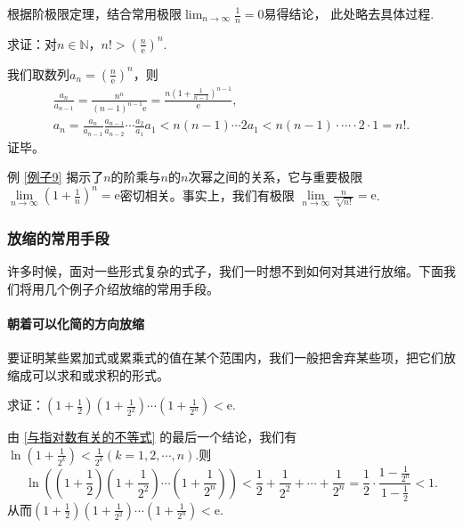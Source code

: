 \begin{itemize}
\begin{prove}
              根据阶极限定理，结合常用极限$\lim_{n\to \infty}\frac{1}{n} = 0$易得结论，
              此处略去具体过程.
          \end{prove}


          \begin{example}
              求证：对$n\in \mathbb{N}$，$n!>\left (\frac{n}{\mathrm e} \right )^n$.\label{例子9}
          \end{example}
          \begin{prove}
              我们取数列$a_n=\left (\frac{n}{\mathrm e} \right )^n$，则
              \begin{gather}
                  \frac{a_n}{a_{n-1}}=\frac{n^n}{(n-1)^{n-1}\mathrm e}=\frac{n\left (1+\frac{1}{n-1}\right )^{n-1}}{\mathrm e},\\
                  a_n=\frac{a_n}{a_{n-1}} \frac{a_{n-1}}{a_{n-2}}\cdots \frac{a_2}{a_1} a_1< n(n-1)\cdots 2a_1<n(n-1)\cdot \cdots \cdot 2\cdot 1=n!.
              \end{gather}
              证毕。
          \end{prove}

          例 \autoref{例子9} 揭示了$n$的阶乘与$n$的$n$次幂之间的关系，它与重要极限$\lim\limits_{n \to \infty}\left (1
              +\frac{1}{n}\right )^n=\mathrm e$密切相关。事实上，我们有极限
          $\lim\limits_{n \to \infty}\frac{n}{\sqrt[n]{n!}}=\mathrm e$.
\end{itemize}

\subsubsection{放缩的常用手段}
\label{sssec:A}
许多时候，面对一些形式复杂的式子，我们一时想不到如何对其进行放缩。下面我们将用几个例子介绍放缩的常用手段。

\paragraph{朝着可以化简的方向放缩}

要证明某些累加式或累乘式的值在某个范围内，我们一般把舍弃某些项，把它们放缩成可以求和或求积的形式。
\begin{example}
    求证：$\left ( 1+\frac{1}{2}\right )\left ( 1+\frac{1}{2^2}\right )
        \cdots \left ( 1+\frac{1}{2^n}\right )<\mathrm{e}$.
\end{example}
\begin{prove}
    由 \eqref{与指对数有关的不等式} 的最后一个结论，我们有$\ln \left ( 1+\frac{1}{2^k}\right )<\frac{1}{2^k}(k=1,2,\cdots,n)$.则
    \[
        \ln\left( \left ( 1+\frac{1}{2}\right )\left ( 1+\frac{1}{2^2}\right )
        \cdots \left ( 1+\frac{1}{2^n}\right ) \right) <\frac{1}{2}+\frac{1}{2^2}
        +\cdots+\frac{1}{2^n}=\frac{1}{2}\cdot \frac{1-\frac{1}{2^n}}{1-\frac{1}{2}}<1
        .\]
    从而$\left ( 1+\frac{1}{2}\right )\left ( 1+\frac{1}{2^2}\right )
        \cdots \left ( 1+\frac{1}{2^n}\right )<\mathrm{e}$.
\end{prove}


